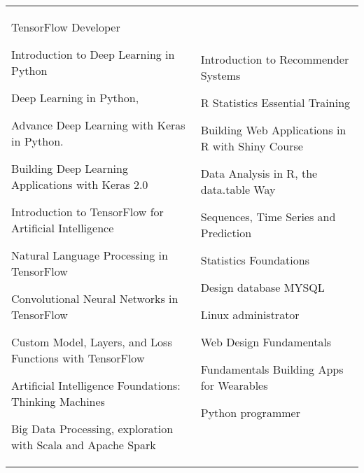 
\begin{tabularx}{\textwidth}{@{}p{} X@{}}
TensorFlow Developer \par
Introduction to Deep Learning in Python\par
Deep Learning in Python,\par 
Advance Deep Learning with Keras in Python.\par
Building Deep Learning Applications with Keras 2.0\par
Introduction to TensorFlow for Artificial Intelligence\par


Natural Language Processing in TensorFlow\par
Convolutional Neural Networks in TensorFlow\par
Custom Model, Layers, and Loss Functions with TensorFlow\par

Artificial Intelligence Foundations: Thinking Machines\par

Big Data Processing, exploration with Scala and Apache Spark\par

&  %
Introduction to Recommender Systems\par

R Statistics Essential Training\par
Building Web Applications in R with Shiny Course\par
Data Analysis in R, the data.table Way\par
Sequences, Time Series and Prediction\par
%
Statistics Foundations\par
Design database MYSQL\par

Linux administrator\par
Web Design Fundamentals\par
Fundamentals Building Apps for Wearables\par
Python programmer\par
\\
\end{tabularx}